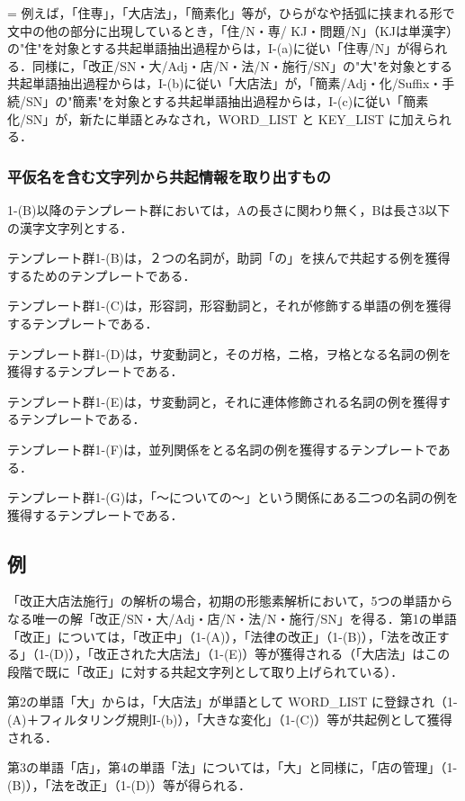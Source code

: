 \parindent=\originalparindent
\leftskip=0mm
例えば，「住専」，「大店法」，「簡素化」等が，ひらがなや括弧に挟まれる形で文中の他の部分に出現しているとき，「住/N・専/ KJ・問題/N」（KJは単漢字）の"住"を対象とする共起単語抽出過程からは，I-(a)に従い「住専/N」が得られる．同様に，「改正/SN・大/Adj・店/N・法/N・施行/SN」の"大"を対象とする共起単語抽出過程からは，I-(b)に従い「大店法」が，「簡素/Adj・化/Suffix・手続/SN」の"簡素"を対象とする共起単語抽出過程からは，I-(c)に従い「簡素化/SN」が，新たに単語とみなされ，WORD\_LIST と KEY\_LIST に加えられる．

\subsubsection{平仮名を含む文字列から共起情報を取り出すもの}\label{平仮名を含む文字列から共起情報を取り出すもの}
1-(B)以降のテンプレート群においては，Aの長さに関わり無く，Bは長さ3以下の漢字文字列とする．

テンプレート群1-(B)は，２つの名詞が，助詞「の」を挟んで共起する例を獲得するためのテンプレートである．

テンプレート群1-(C)は，形容詞，形容動詞と，それが修飾する単語の例を獲得するテンプレートである．

テンプレート群1-(D)は，サ変動詞と，そのガ格，ニ格，ヲ格となる名詞の例を獲得するテンプレートである．

テンプレート群1-(E)は，サ変動詞と，それに連体修飾される名詞の例を獲得するテンプレートである．

テンプレート群1-(F)は，並列関係をとる名詞の例を獲得するテンプレートである．

テンプレート群1-(G)は，「〜についての〜」という関係にある二つの名詞の例を獲得するテンプレートである．

\subsection{例}\label{例}
「改正大店法施行」の解析の場合，初期の形態素解析において，5つの単語からなる唯一の解「改正/SN・大/Adj・店/N・法/N・施行/SN」を得る．第1の単語「改正」については，「改正中」（1-(A)），「法律の改正」（1-(B)），「法を改正する」（1-(D)），「改正された大店法」（1-(E)）等が獲得される（「大店法」はこの段階で既に「改正」に対する共起文字列として取り上げられている）．

第2の単語「大」からは，「大店法」が単語として WORD\_LIST に登録され（1-(A)＋フィルタリング規則I-(b)），「大きな変化」（1-(C)）等が共起例として獲得される．

第3の単語「店」，第4の単語「法」については，「大」と同様に，「店の管理」（1-(B)），「法を改正」（1-(D)）等が得られる．

